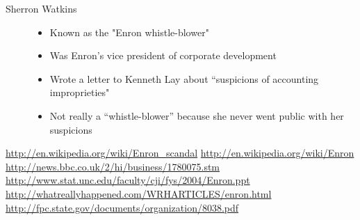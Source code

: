 \documentclass[a4paper,11pt,oneside]{book}
\begin{document}
\begin{description}
\item [Sherron Watkins]  
\begin{itemize}
\item Known as the "Enron whistle-blower" 
\item Was Enron's vice president of corporate development
\item Wrote a letter to Kenneth Lay about “suspicions of accounting improprieties"  
\item Not really a “whistle-blower” because she never went public with her suspicions

\end{itemize}
\end{description}

\pagebreak
\begin{thebibliography}{XXX}
	 \url{http://en.wikipedia.org/wiki/Enron_scandal}
	 \url{http://en.wikipedia.org/wiki/Enron}
	 \url{http://news.bbc.co.uk/2/hi/business/1780075.stm}
	 \url{http://www.stat.unc.edu/faculty/cji/fys/2004/Enron.ppt}
	 \url{http://whatreallyhappened.com/WRHARTICLES/enron.html}
	 \url{http://fpc.state.gov/documents/organization/8038.pdf}
\end{thebibliography}
\end{document}
